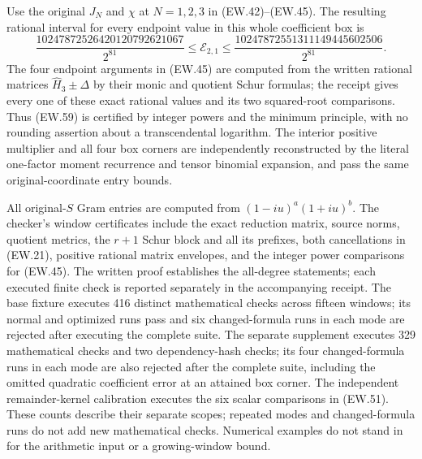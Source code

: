 Use the original $J_N$ and $\chi$ at $N=1,2,3$ in
(EW.42)--(EW.45). The resulting rational interval for every
endpoint value in this whole coefficient box is
\[
 \boxed{\frac{10247872526420120792621067}{2^{81}}
 \le\mathcal E_{2,1}\le
 \frac{10247872551311149445602506}{2^{81}}.}                  \tag{EW.59}
\]
The four endpoint arguments in (EW.45) are computed from the
written rational matrices $\widehat H_3\pm\Delta$ by their
monic and quotient Schur formulas; the receipt gives every one
of these exact rational values and its two squared-root comparisons.
Thus (EW.59) is certified by integer powers and the minimum
principle, with no rounding assertion about a transcendental
logarithm. The interior positive multiplier and all four box
corners are independently reconstructed by the literal one-factor
moment recurrence and tensor binomial expansion, and pass the
same original-coordinate entry bounds.

All original-$S$ Gram entries are computed from
$(1-iu)^a(1+iu)^b$. The checker's window certificates include
the exact reduction matrix, source norms, quotient metrics,
the $r+1$ Schur block and all its prefixes, both cancellations
in (EW.21), positive rational matrix envelopes, and the integer
power comparisons for (EW.45). The written proof establishes
the all-degree statements; each executed finite check is reported
separately in the accompanying receipt. The base fixture executes
416 distinct mathematical checks across fifteen windows; its normal
and optimized runs pass and six changed-formula runs in each mode
are rejected after executing the complete suite. The separate
supplement executes 329 mathematical checks and two dependency-hash
checks; its four changed-formula runs in each mode are also rejected
after the complete suite, including the omitted quadratic coefficient
error at an attained box corner. The independent remainder-kernel
calibration executes the six scalar comparisons in (EW.51).
These counts describe their separate scopes; repeated modes and
changed-formula runs do not add new mathematical checks. Numerical
examples do not stand in for the arithmetic input or a growing-window bound.


\endgroup
